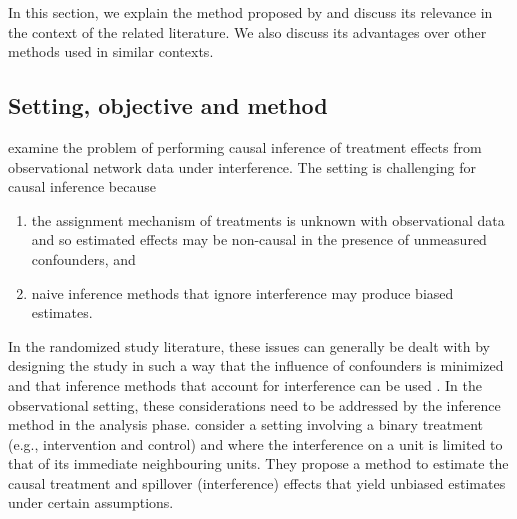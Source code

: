 \documentclass[10pt]{article}
\begin{document}
\todo In this section, we explain the method proposed by \textcite{Forastiere:2021} and discuss its relevance in the context of the related literature. We also discuss its advantages over other methods used in similar contexts.

\subsection{Setting, objective and method}

\textcite{Forastiere:2021} examine the problem of performing causal inference of treatment effects from observational network data under interference. The setting is challenging for causal inference because
\begin{enumerate}
\item
the assignment mechanism of treatments is unknown with observational data and so estimated effects may be non-causal in the presence of unmeasured confounders, and
\item
naive inference methods that ignore interference may produce biased estimates.
\end{enumerate}
In the randomized study literature, these issues can generally be dealt with by designing the study in such a way that the influence of confounders is minimized and that inference methods that account for interference can be used \parencite[e.g.,][]{Saveski:2017,Jagadeesan:2020,Imai:2021,Doudchenko:2020}. In the observational setting, these considerations need to be addressed by the inference method in the analysis phase. \citeauthor{Forastiere:2021} consider a setting involving a binary treatment (e.g., intervention and control) and where the interference on a unit is limited to that of its immediate neighbouring units. They propose a method to estimate the causal treatment and spillover (interference) effects that yield unbiased estimates under certain assumptions.
\\
\end{document}
